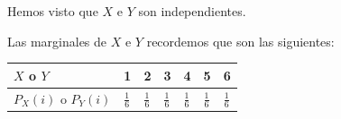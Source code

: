 \documentclass[]{book}
\begin{document}
Hemos visto que \(X\) e \(Y\) son independientes.

Las marginales de \(X\) e \(Y\) recordemos que son las siguientes:

\begin{longtable}[]{@{}lllllll@{}}
\toprule
\begin{minipage}[b]{0.15\columnwidth}\raggedright
\(X\) o \(Y\)\strut
\end{minipage} & \begin{minipage}[b]{0.11\columnwidth}\raggedright
1\strut
\end{minipage} & \begin{minipage}[b]{0.11\columnwidth}\raggedright
2\strut
\end{minipage} & \begin{minipage}[b]{0.11\columnwidth}\raggedright
3\strut
\end{minipage} & \begin{minipage}[b]{0.11\columnwidth}\raggedright
4\strut
\end{minipage} & \begin{minipage}[b]{0.11\columnwidth}\raggedright
5\strut
\end{minipage} & \begin{minipage}[b]{0.11\columnwidth}\raggedright
6\strut
\end{minipage}\tabularnewline
\midrule
\endhead
\begin{minipage}[t]{0.15\columnwidth}\raggedright
\(P_X(i)\) o \(P_Y(i)\)\strut
\end{minipage} & \begin{minipage}[t]{0.11\columnwidth}\raggedright
\(\frac{1}{6}\)\strut
\end{minipage} & \begin{minipage}[t]{0.11\columnwidth}\raggedright
\(\frac{1}{6}\)\strut
\end{minipage} & \begin{minipage}[t]{0.11\columnwidth}\raggedright
\(\frac{1}{6}\)\strut
\end{minipage} & \begin{minipage}[t]{0.11\columnwidth}\raggedright
\(\frac{1}{6}\)\strut
\end{minipage} & \begin{minipage}[t]{0.11\columnwidth}\raggedright
\(\frac{1}{6}\)\strut
\end{minipage} & \begin{minipage}[t]{0.11\columnwidth}\raggedright
\(\frac{1}{6}\)\strut
\end{minipage}\tabularnewline
\bottomrule
\end{longtable}
\end{document}
